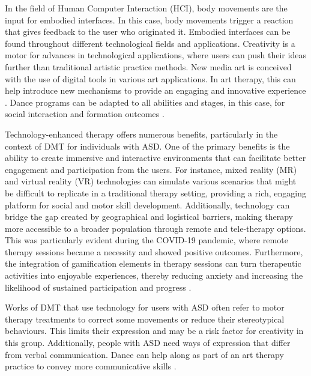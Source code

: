 \documentclass[a4paper,fleqn]{cas-sc}
\begin{document}
In the field of Human Computer Interaction (HCI), body movements are the input for embodied interfaces. In this case, body movements trigger a reaction that gives feedback to the user who originated it. Embodied interfaces can be found throughout different technological fields and applications. Creativity is a motor for advances in technological applications, where users can push their ideas further than traditional artistic practice methods. New media art is conceived with the use of digital tools in various art applications. In art therapy, this can help introduce new mechanisms to provide an engaging and innovative experience \cite{Papadopoulou2016}.  Dance programs can be adapted to all abilities and stages, in this case, for social interaction and formation outcomes 
\cite{Reinders19}.


Technology-enhanced therapy offers numerous benefits, particularly in the context of DMT for individuals with ASD. One of the primary benefits is the ability to create immersive and interactive environments that can facilitate better engagement and participation from the users. For instance, mixed reality (MR) and virtual reality (VR) technologies can simulate various scenarios that might be difficult to replicate in a traditional therapy setting, providing a rich, engaging platform for social and motor skill development. Additionally, technology can bridge the gap created by geographical and logistical barriers, making therapy more accessible to a broader population through remote and tele-therapy options. This was particularly evident during the COVID-19 pandemic, where remote therapy sessions became a necessity and showed positive outcomes. Furthermore, the integration of gamification elements in therapy sessions can turn therapeutic activities into enjoyable experiences, thereby reducing anxiety and increasing the likelihood of sustained participation and progress \cite{Parsons2011, Zhang2022}.

Works of DMT that use technology for users with ASD often refer to motor therapy treatments to correct some movements or reduce their stereotypical behaviours. This limits their expression and may be a risk factor for creativity in this group. Additionally, people with ASD need ways of expression that differ from verbal communication. Dance can help along as part of an art therapy practice to convey more communicative skills \cite{Takahashi2019}.
\end{document}
